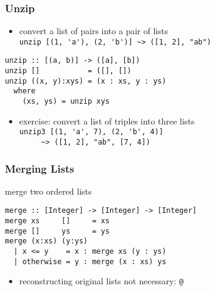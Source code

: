 \documentclass[dvipsnames]{beamer}
\theoremstyle{plain}
\begin{document}
\begin{frame}[fragile]
  \frametitle{Unzip}

  \begin{itemize}
    \item convert a list of pairs into a pair of lists\\
      \lstinline[style=exclamfix]|unzip [(1, 'a'), (2, 'b')] ~> ([1, 2], "ab")|
  \end{itemize}

  \begin{exampleblock}{}
    \begin{lstlisting}[deletekeywords={unzip}]
unzip :: [(a, b)] -> ([a], [b])
unzip []           = ([], [])
unzip ((x, y):xys) = (x : xs, y : ys)
  where
    (xs, ys) = unzip xys
    \end{lstlisting}
  \end{exampleblock}

  \pause
  \begin{itemize}
    \item exercise: convert a list of triples into three lists\\
      \lstinline[style=exclamfix]|unzip3 [(1, 'a', 7), (2, 'b', 4)]|\\
      \lstinline[style=exclamfix]|     ~> ([1, 2], "ab", [7, 4])|
  \end{itemize}
\end{frame}


\begin{frame}[fragile]
  \frametitle{Merging Lists}

  \begin{exampleblock}{merge two ordered lists}
    \begin{lstlisting}
merge :: [Integer] -> [Integer] -> [Integer]
merge xs     []     = xs
merge []     ys     = ys
merge (x:xs) (y:ys)
  | x <= y    = x : merge xs (y : ys)
  | otherwise = y : merge (x : xs) ys
    \end{lstlisting}
  \end{exampleblock}

  \begin{itemize}
    \item reconstructing original lists not necessary: \lstinline|@|
  \end{itemize}
\end{frame}
\end{document}

